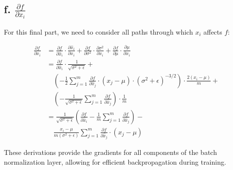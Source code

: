 \subsection*{f. $\frac{\partial f}{\partial x_i}$}

For this final part, we need to consider all paths through which $x_i$ affects $f$:

\begin{align*}
\frac{\partial f}{\partial x_i} &= \frac{\partial f}{\partial \hat{x}_i} \cdot \frac{\partial \hat{x}_i}{\partial x_i} + \frac{\partial f}{\partial \sigma^2} \cdot \frac{\partial \sigma^2}{\partial x_i} + \frac{\partial f}{\partial \mu} \cdot \frac{\partial \mu}{\partial x_i} \\
&= \frac{\partial f}{\partial \hat{x}_i} \cdot \frac{1}{\sqrt{\sigma^2 + \epsilon}} + \\
&\quad (-\frac{1}{2}\sum_{j=1}^m \frac{\partial f}{\partial \hat{x}_j} \cdot (x_j - \mu) \cdot (\sigma^2 + \epsilon)^{-3/2}) \cdot \frac{2(x_i - \mu)}{m} + \\
&\quad (-\frac{1}{\sqrt{\sigma^2 + \epsilon}} \sum_{j=1}^m \frac{\partial f}{\partial \hat{x}_j}) \cdot \frac{1}{m} \\
&= \frac{1}{\sqrt{\sigma^2 + \epsilon}} \left(\frac{\partial f}{\partial \hat{x}_i} - \frac{1}{m} \sum_{j=1}^m \frac{\partial f}{\partial \hat{x}_j}\right) - \\
&\quad \frac{x_i - \mu}{m(\sigma^2 + \epsilon)} \sum_{j=1}^m \frac{\partial f}{\partial \hat{x}_j} \cdot (x_j - \mu)
\end{align*}

These derivations provide the gradients for all components of the batch normalization layer, allowing for efficient backpropagation during training.
